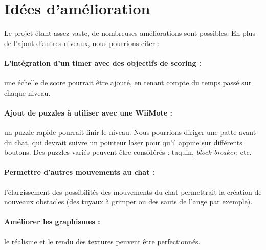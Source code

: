\documentclass[a4paper,11pt]{article}
\begin{document}
\section{Idées d'amélioration}
Le projet étant assez vaste, de nombreuses améliorations sont possibles. En plus de l'ajout d'autres niveaux, nous pourrions citer : 
\paragraph{L'intégration d'un timer avec des objectifs de scoring :} une échelle de score pourrait être ajouté, en tenant compte du temps passé sur chaque niveau.
\paragraph{Ajout de puzzles à utiliser avec une WiiMote :} un puzzle rapide pourrait finir le niveau. Nous pourrions diriger une patte avant du chat, qui devrait suivre un pointeur laser pour qu'il appuie sur différents boutons. Des puzzles variés peuvent être considérés : taquin, \textit{block breaker}, etc. %
\paragraph{Permettre d'autres mouvements au chat :} l'élargissement des possibilités des mouvements du chat permettrait la création de nouveaux obstacles (des tuyaux à grimper ou des sauts de l'ange par exemple).
\paragraph{Améliorer les graphismes :} le réalisme et le rendu des textures peuvent être perfectionnés.
\\
\end{document}
